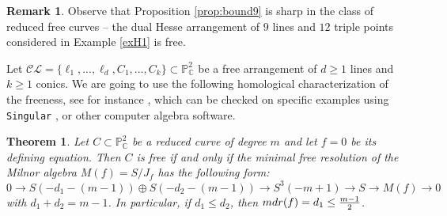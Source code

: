 \documentclass[12pt]{amsart}
\theoremstyle{plain}
\newtheorem{thm}[subsection]{Theorem}
\theoremstyle{definition}
\newtheorem{rk}[subsection]{Remark}
\numberwithin{equation}{section}
\begin{document}
\begin{rk}
Observe that Proposition \ref{prop:bound9} is sharp in the class of reduced free curves -- the dual Hesse arrangement of $9$ lines and $12$ triple points considered in Example \ref{exH1} is free.
\end{rk}
Let $\mathcal{CL} = \{\ell_{1}, ..., \ell_{d}, C_{1}, ..., C_{k}\} \subset \mathbb{P}^{2}_{\mathbb{C}}$ be a free arrangement of $d \geq 1$ lines and $k\geq 1$ conics. We are going to use the following homological characterization of the freeness, see for instance \cite{DimcaSticlaru}, which can be checked on specific examples using \verb{Singular{ \cite{Singular}, or other computer algebra software.
\begin{thm}
 \label{thmF}
Let $C \subset \mathbb{P}^{2}_{\mathbb{C}}$ be a reduced curve of degree $m$ and let $f=0$ be its defining equation. Then $C$ is free if and only if the minimal free resolution of the Milnor algebra $M(f) = S/J_{f}$ has the following form:
\begin{equation*}
0 \rightarrow S(-d_{1}-(m-1)) \oplus S(-d_{2}-(m-1)) \rightarrow S^{3}(-m+1)\rightarrow S \rightarrow M(f) \rightarrow 0
\end{equation*}
with $d_{1} + d_{2} = m-1$.  In particular, if $d_1 \leq d_2$, then ${\rm mdr}(f)=d_1 \leq \frac{m-1}{2}$. \end{thm}
\end{document}
